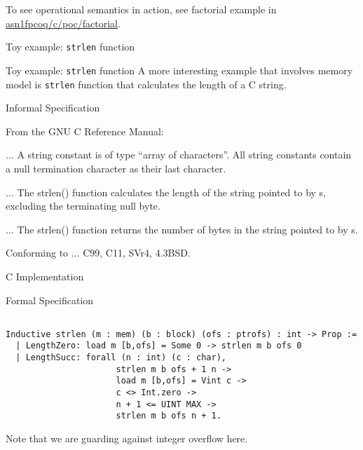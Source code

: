 \documentclass{beamer}
\begin{document}
\begin{frame} To see operational semantics in action, see factorial example in \url{asn1fpcoq/c/poc/factorial}.
  \end{frame}

           

  \begin{frame}
  \begin{center}
    \huge Toy example: \texttt{strlen} function
  \end{center}
  \end{frame}

  \begin{frame}{Toy example: \texttt{strlen} function}
    A more interesting example that involves memory model is \texttt{strlen} function that calculates the length of a C string.
    \end{frame}

\begin{frame}{Informal Specification}


  From the GNU C Reference Manual:
 \bigskip


  $\ldots$ A string constant is of type ``array of characters''. All string constants contain a null termination character as their last character.

\bigskip

$\ldots$ The strlen() function calculates the length of the string pointed to
 by s, excluding the terminating null byte.

 \bigskip

 
$\ldots$ 
 The strlen() function returns the number of bytes in the string
 pointed to by s.

 \bigskip

Conforming to $\ldots$ C99, C11, SVr4, 4.3BSD.



\end{frame}

\begin{frame}{C Implementation}



\end{frame}

\begin{frame}[t,fragile]{Formal Specification}

  \begin{lstlisting}[language=Coq]
    
Inductive strlen (m : mem) (b : block) (ofs : ptrofs) : int -> Prop :=
  | LengthZero: load m [b,ofs] = Some 0 -> strlen m b ofs 0
  | LengthSucc: forall (n : int) (c : char),
                      strlen m b ofs + 1 n ->
                      load m [b,ofs] = Vint c ->
                      c <> Int.zero ->
                      n + 1 <= UINT MAX ->
                      strlen m b ofs n + 1.
                    \end{lstlisting}
                    
Note that we are guarding against integer overflow here.  
  
\end{frame}
\end{document}

